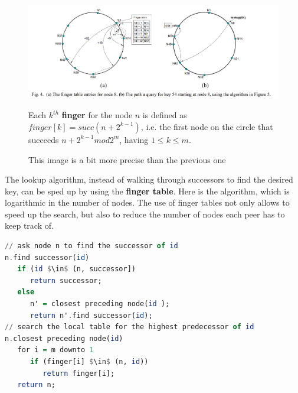 \begin{figure}[htbp]
   \centering
   \includegraphics{images/dht_chordfinger.png}
   \caption{This image is a bit more precise than the previous one}
   \label{fig:dht_chordfinger}
   Each $k^{th}$ \textbf{finger} for the node $n$ is defined as $finger[k] = succ(n+2^{k-1})$, i.e. the first node on the circle that succeeds $n+2^{k-1} mod 2^m$, having $1 \leq k \leq m$. 
\end{figure}

\begin{paracol}{2}
   \colfill
   The lookup algorithm, instead of walking through successors to find the desired key, can be sped up by using the \textbf{finger table}.
   Here is the algorithm, which is logarithmic in the number of nodes.
   The use of finger tables not only allows to speed up the search, but also to reduce the number of nodes each peer has to keep track of.

   \colfill
   \switchcolumn
   \begin{lstlisting}[mathescape=true,basicstyle={\footnotesize\ttfamily},language=Haskell]
// ask node n to find the successor of id
n.find successor(id)
   if (id $\in$ (n, successor])
      return successor;
   else
      n' = closest preceding node(id );
      return n'.find successor(id);
// search the local table for the highest predecessor of id
n.closest preceding node(id)
   for i = m downto 1
      if (finger[i] $\in$ (n, id))
         return finger[i];
   return n;  
   \end{lstlisting}
\end{paracol}

